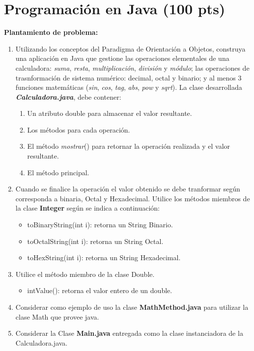 \documentclass{exam}
\begin{document}
\vspace{-7mm}
\section{\textbf{Programaci\'on en Java (100 pts)}}
\noindent
\textbf{Plantamiento de problema: }

\begin{questions}


\begin{enumerate}
    \item[ ] Utilizando los conceptos del Paradigma de Orientaci\'on a Objetos,
     construya una aplicaci\'on en Java que gestione las operaciones elementales de una calculadora:
     \emph{suma}, \emph{resta}, \emph{multiplicaci\'on}, \emph{divisi\'on} y \emph{m\'odulo};
     las operaciones de trasnformaci\'on de sistema num\'erico: decimal, octal y binario;
     y al menos 3 funciones matem\'aticas (\emph{sin}, \emph{cos}, \emph{tag}, \emph{abs}, \emph{pow} y \emph{sqrt}).
     La clase desarrollada \textbf{\emph{Calculadora.java}}, debe contener:
    \begin{enumerate}
	    \item Un atributo double para almacenar el valor resultante.
	    \item Los m\'etodos para cada operaci\'on.
	    \item El m\'etodo \emph{mostrar}() para retornar la operaci\'on realizada y el valor resultante.
	    \item El m\'etodo principal.
	\end{enumerate}
	\item[] Cuando se finalice la operación el valor obtenido se debe tranformar seg\'un corresponda a binaria, Octal y Hexadecimal.
  Utilice los m\'etodos miembros de la clase \textbf{Integer} seg\'un se indica a continuaci\'on:
	\begin{itemize}
	    \item toBinaryString(int i): retorna un String Binario.
	    \item toOctalString(int i): retorna un String Octal.
	    \item toHexString(int i): retorna un String Hexadecimal.
	\end{itemize}
	\item[] Utilice el m\'etodo miembro de la clase Double.
	\begin{itemize}
	    \item intValue(): retorna el valor entero de un double.
	\end{itemize}
  \item Considerar como ejemplo de uso la clase \textbf{MathMethod.java} para utilizar la clase Math que provee java.
  \item Considerar la Clase \textbf{Main.java} entregada como la clase instanciadora de la Calculadora.java.
\end{enumerate}
\end{questions}
\end{document}
